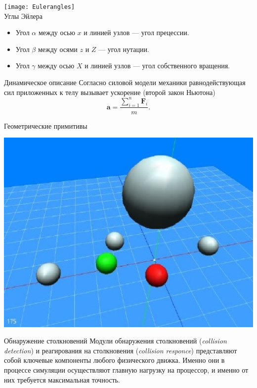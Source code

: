 \documentclass[xetex,12pt,compress,hyperref={xetex}]{beamer}
\begin{document}
 \begin{frame}
 \begin{center}
   \texttt{[image: Eulerangles]}  \\
     \figurename{Углы Эйлера}
  \end{center}
  \begin{itemize}
  \item Угол $\alpha$ между осью $x$ и линией узлов --- угол прецессии.
  \item Угол $\beta$ между осями $z$ и $Z$ --- угол нутации.
  \item Угол $\gamma$ между осью $X$ и линией узлов --- угол собственного вращения.
\end{itemize}
 \end{frame}

\begin{frame}{Динамическое описание}
Согласно силовой модели механики равнодействующая сил приложенных к телу вызывает ускорение (второй закон Ньютона)
\begin{equation}
 \mathbf{a}=\frac{\sum\limits_{i=1}^n{\mathbf{F}_i}}{m}.
\end{equation}
\end{frame} 
 
 \begin{frame}{Геометрические примитивы} 
  \begin{center}
   \includegraphics[scale=0.5]{Spheres}  \\
  \end{center}   
 \end{frame}
 
 
 \begin{frame}{Обнаружение столкновений}
  Модули обнаружения столкновений (\textit{collision detection}) и реагирования на столкновения (\textit{collision responce}) представляют 
  собой ключевые компоненты любого физического движка. Именно они в процессе симуляции осуществляют главную нагрузку на
  процессор, и именно от них требуется максимальная точность.
 \end{frame}
 
\end{document}
